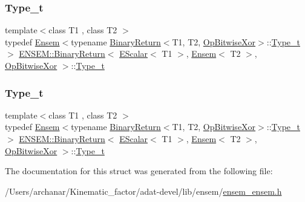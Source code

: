 \subsubsection{\texorpdfstring{Type\_t}{Type\_t}\hspace{0.1cm}{\footnotesize\ttfamily [2/3]}}
{\footnotesize\ttfamily template$<$class T1 , class T2 $>$ \\
typedef \mbox{\hyperlink{classENSEM_1_1Ensem}{Ensem}}$<$typename \mbox{\hyperlink{structENSEM_1_1BinaryReturn}{Binary\+Return}}$<$T1, T2, \mbox{\hyperlink{structENSEM_1_1OpBitwiseXor}{Op\+Bitwise\+Xor}}$>$\+::\mbox{\hyperlink{structENSEM_1_1BinaryReturn_3_01EScalar_3_01T1_01_4_00_01Ensem_3_01T2_01_4_00_01OpBitwiseXor_01_4_a08cef6d7aa7262985d42b0a1afe37f79}{Type\+\_\+t}}$>$ \mbox{\hyperlink{structENSEM_1_1BinaryReturn}{E\+N\+S\+E\+M\+::\+Binary\+Return}}$<$ \mbox{\hyperlink{classENSEM_1_1EScalar}{E\+Scalar}}$<$ T1 $>$, \mbox{\hyperlink{classENSEM_1_1Ensem}{Ensem}}$<$ T2 $>$, \mbox{\hyperlink{structENSEM_1_1OpBitwiseXor}{Op\+Bitwise\+Xor}} $>$\+::\mbox{\hyperlink{structENSEM_1_1BinaryReturn_3_01EScalar_3_01T1_01_4_00_01Ensem_3_01T2_01_4_00_01OpBitwiseXor_01_4_a08cef6d7aa7262985d42b0a1afe37f79}{Type\+\_\+t}}}

\mbox{\label{structENSEM_1_1BinaryReturn_3_01EScalar_3_01T1_01_4_00_01Ensem_3_01T2_01_4_00_01OpBitwiseXor_01_4_a08cef6d7aa7262985d42b0a1afe37f79}} 
\subsubsection{\texorpdfstring{Type\_t}{Type\_t}\hspace{0.1cm}{\footnotesize\ttfamily [3/3]}}
{\footnotesize\ttfamily template$<$class T1 , class T2 $>$ \\
typedef \mbox{\hyperlink{classENSEM_1_1Ensem}{Ensem}}$<$typename \mbox{\hyperlink{structENSEM_1_1BinaryReturn}{Binary\+Return}}$<$T1, T2, \mbox{\hyperlink{structENSEM_1_1OpBitwiseXor}{Op\+Bitwise\+Xor}}$>$\+::\mbox{\hyperlink{structENSEM_1_1BinaryReturn_3_01EScalar_3_01T1_01_4_00_01Ensem_3_01T2_01_4_00_01OpBitwiseXor_01_4_a08cef6d7aa7262985d42b0a1afe37f79}{Type\+\_\+t}}$>$ \mbox{\hyperlink{structENSEM_1_1BinaryReturn}{E\+N\+S\+E\+M\+::\+Binary\+Return}}$<$ \mbox{\hyperlink{classENSEM_1_1EScalar}{E\+Scalar}}$<$ T1 $>$, \mbox{\hyperlink{classENSEM_1_1Ensem}{Ensem}}$<$ T2 $>$, \mbox{\hyperlink{structENSEM_1_1OpBitwiseXor}{Op\+Bitwise\+Xor}} $>$\+::\mbox{\hyperlink{structENSEM_1_1BinaryReturn_3_01EScalar_3_01T1_01_4_00_01Ensem_3_01T2_01_4_00_01OpBitwiseXor_01_4_a08cef6d7aa7262985d42b0a1afe37f79}{Type\+\_\+t}}}



The documentation for this struct was generated from the following file\+:\begin{DoxyCompactItemize}
\item 
/\+Users/archanar/\+Kinematic\+\_\+factor/adat-\/devel/lib/ensem/\mbox{\hyperlink{adat-devel_2lib_2ensem_2ensem__ensem_8h}{ensem\+\_\+ensem.\+h}}\end{DoxyCompactItemize}

